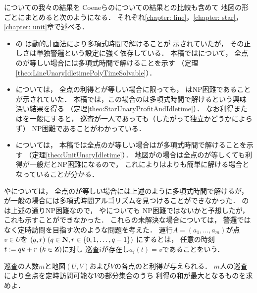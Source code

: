 {\patProb}についての我々の結果を
Coeneらの{\independentPatProb}についての結果との比較も含めて
地図の形ごとにまとめると次のようになる．
それぞれ\ref{chapter: line}，\ref{chapter: star}，\ref{chapter: unit}章で述べる．
\begin{itemize}
\item 
  {\graphLine}の
  {\independentPatProb}は動的計画法により多項式時間で解けることが
  示されていた\cite[Theorem~11]{coene2011charlemagne}が，
  その正しさは単独警邏という設定に強く依存している．
  本稿では{\patProb}について，
  全点の{\maxIdletime}が等しい場合には多項式時間で解けることを示す
  （定理\ref{theo:LineUnaryIdletimePolyTimeSolvable}）．
\item
  {\graphStar}については，
  全点の利得と{\maxIdletime}が等しい場合に限っても，
  {\independentPatProb}はNP困難であることが示されていた\cite[Theorem~10]{coene2011charlemagne}．
  本稿では，この場合の{\patProb}は多項式時間で解けるという興味深い結果を得る
  （定理\ref{theo:StarUnaryProfitAndIdletime}）．
  なお利得または{\maxIdletime}を一般にすると，
  巡査が一人であっても（したがって独立かどうかによらず）
  NP困難であることがわかっている\cite[Theorems 5 and 6]{coene2011charlemagne}．
\item 
  {\graphUnit}については，
  本稿では全点の{\maxIdletime}が等しい場合は{\patProb}が多項式時間で解けることを示す
  （定理\ref{theo:UnitUnaryIdletime}）．
  地図が{\graphStar}の場合は全点の{\maxIdletime}が等しくても利得が一般だとNP困難になるので，
  これにより{\graphUnit}は{\graphStar}よりも簡単に解ける場合となっていることが分かる．
\end{itemize}

{\graphLine}や{\graphUnit}については，
全点の{\maxIdletime}が等しい場合には上述のように多項式時間で解けるが，
{\maxIdletime}が一般の場合には多項式時間アルゴリズムを見つけることができなかった．
{\graphStar}の{\patProb}は上述の通りNP困難なので\cite[Theorems 5 and 6]{coene2011charlemagne}，
{\graphLine}や{\graphUnit}についても
NP困難ではないかと予想したが，これも示すことができなかった．
これらの未解決な場合については，
警邏ではなく定時訪問を目指す次のような問題を考えた．
%
運行$A = (a _1, \ldots, a _m)$が点$v \in U$を
{\exactTime}$(q, r)\ (q \in \mathbf N, r \in \{ 0, 1, \ldots, q - 1 \})$%
にするとは，
任意の時刻$t := q k + r\ (k \in \mathbf Z)$に対し
巡査$i$が存在し$a _i (t) = v$であることをいう．

\begin{timeSpecifiedPatrollingProblem}
  巡査の人数$m$と地図$(U, V)$および$V$の各点の{\exactTime}と利得が与えられる．
  $m$人の巡査により全点を定時訪問可能な$V$の部分集合のうち
  利得の和が最大となるものを求めよ．
\end{timeSpecifiedPatrollingProblem}

